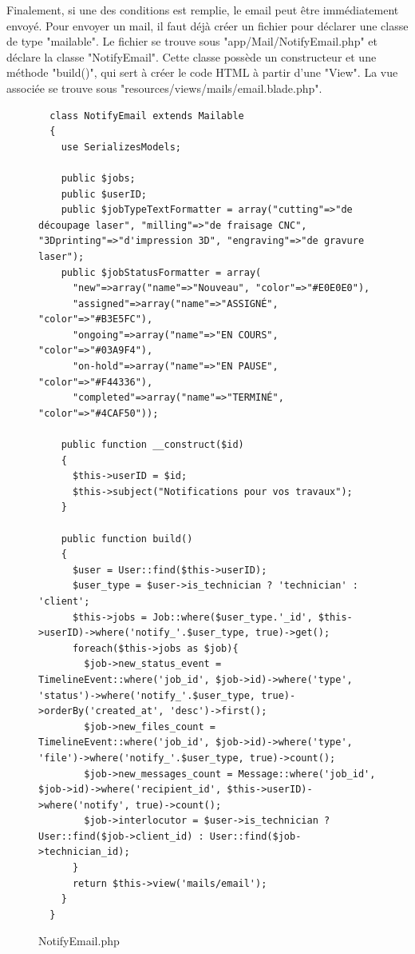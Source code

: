 \documentclass[
    iai, %
    eai, %
]{heig-tb}
\begin{document}
\newpage
Finalement, si une des conditions est remplie, le email peut être immédiatement envoyé. Pour envoyer un mail, il faut déjà créer un fichier pour déclarer une classe de type "mailable". Le fichier se trouve sous "app/Mail/NotifyEmail.php" et déclare la classe "NotifyEmail". Cette classe possède un constructeur et une méthode "build()", qui sert à créer le code HTML à partir d'une "View". La vue associée se trouve sous "resources/views/mails/email.blade.php".

\begin{figure}[h]
  \begin{verbatim}
  class NotifyEmail extends Mailable
  {
    use SerializesModels;

    public $jobs;
    public $userID;
    public $jobTypeTextFormatter = array("cutting"=>"de découpage laser", "milling"=>"de fraisage CNC", "3Dprinting"=>"d'impression 3D", "engraving"=>"de gravure laser");
    public $jobStatusFormatter = array(
      "new"=>array("name"=>"Nouveau", "color"=>"#E0E0E0"),
      "assigned"=>array("name"=>"ASSIGNÉ", "color"=>"#B3E5FC"),
      "ongoing"=>array("name"=>"EN COURS", "color"=>"#03A9F4"),
      "on-hold"=>array("name"=>"EN PAUSE", "color"=>"#F44336"),
      "completed"=>array("name"=>"TERMINÉ", "color"=>"#4CAF50"));

    public function __construct($id)
    {
      $this->userID = $id;
      $this->subject("Notifications pour vos travaux");
    }

    public function build()
    {
      $user = User::find($this->userID);
      $user_type = $user->is_technician ? 'technician' : 'client';
      $this->jobs = Job::where($user_type.'_id', $this->userID)->where('notify_'.$user_type, true)->get();
      foreach($this->jobs as $job){
        $job->new_status_event = TimelineEvent::where('job_id', $job->id)->where('type', 'status')->where('notify_'.$user_type, true)->orderBy('created_at', 'desc')->first();
        $job->new_files_count = TimelineEvent::where('job_id', $job->id)->where('type', 'file')->where('notify_'.$user_type, true)->count();
        $job->new_messages_count = Message::where('job_id', $job->id)->where('recipient_id', $this->userID)->where('notify', true)->count();
        $job->interlocutor = $user->is_technician ? User::find($job->client_id) : User::find($job->technician_id);
      }
      return $this->view('mails/email');
    }
  }
  \end{verbatim}
  \caption{NotifyEmail.php}
\end{figure}
\end{document}
